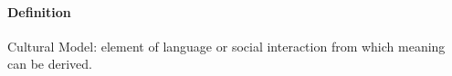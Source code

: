 \begin{tcolorbox}
\small
\paragraph{Definition}
\gls{Cultural Model}: element of language or social interaction from which meaning can be derived.
\end{tcolorbox}